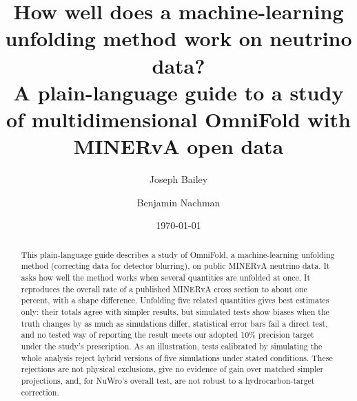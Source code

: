 \documentclass[11pt]{article}
\title{How well does a machine-learning unfolding method work on neutrino data?\\[4pt]
\large A plain-language guide to a study of multidimensional OmniFold with
MINERvA open data}
\author{Joseph Bailey \and Benjamin Nachman}
\date{\today}
\begin{document}
\maketitle

\begin{abstract}
This plain-language guide describes a study of OmniFold, a machine-learning
unfolding method (correcting data for detector blurring),
on public MINERvA neutrino data. It asks how well the method works when
several quantities are unfolded at once. It reproduces the overall rate of a
published MINERvA cross section to about one percent, with a shape
difference. Unfolding five related quantities gives best estimates only:
their totals agree with simpler results, but simulated tests show biases
when the truth changes by as much as simulations differ, statistical error bars fail a
direct test, and no tested way of reporting the result meets our adopted 10\%
precision target under the study's prescription. As an illustration, tests
calibrated by simulating the whole analysis reject hybrid versions of five
simulations under stated conditions. These rejections are not
physical exclusions, give no evidence of gain over matched simpler
projections, and, for NuWro's overall test, are not robust to a
hydrocarbon-target correction.
\end{abstract}



\printbibliography
\end{document}
